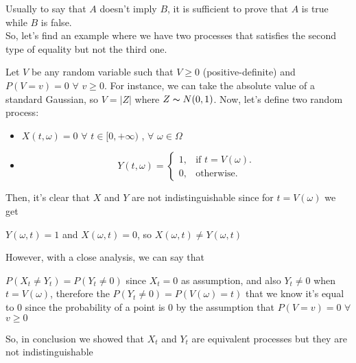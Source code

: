 Usually to say that $A$ doesn't imply $B$, it is sufficient to prove that $A$ is true while $B$ is false.\\
So, let's find an example where we have two processes that satisfies the second type of equality but not the third one.\\
\begin{example}
Let $V$ be any random variable such that $V \geq 0$ (positive-definite) and $P(V=v)=0$ $\forall$ $v \geq 0$.
For instance, we can take the absolute value of a standard Gaussian, so $V = |Z|$ where $Z \thicksim N(0,1)$. 
Now, let's define two random process: 
\begin{itemize}
    \item $X(t, \omega)= 0$ $\forall$ $t \in [0, +\infty)$ , $\forall$ $\omega \in \Omega$
    \item\begin{equation}
        Y(t, \omega)=\begin{cases}
         1, & \text{if $t = V(\omega)$}.\\
         0, & \text{otherwise}.
  \end{cases}
\end{equation}
\end{itemize}
Then, it's clear that $X$ and $Y$ are not indistinguishable since for $t = V(\omega)$ we get 
\begin{center}
    $Y(\omega, t)=1$ and $X(\omega, t)= 0$, so $X(\omega, t) \neq Y(\omega, t)$
\end{center}
However, with a close analysis, we can say that 
\begin{center}
    $P(X_t \neq Y_t) = P(Y_t \neq 0)$ since $X_t = 0$ as assumption, and also $Y_t \neq 0$ when $t = V(\omega)$, therefore the $P(Y_t \neq 0) = P(V(\omega)=t)$ that we know it's equal to $0$ since the probability of a point is $0$ by the assumption that $P(V=v) = 0$ $\forall$ $ v \geq 0$
\end{center}
So, in conclusion we showed that $X_t$ and $Y_t$ are equivalent processes but they are not indistinguishable
\end{example}
